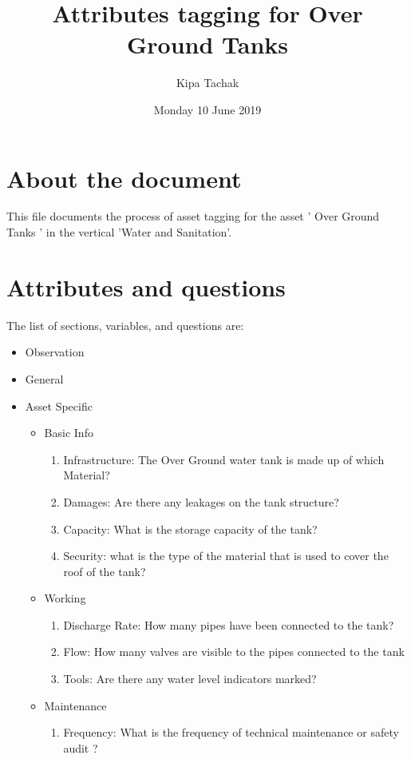 \documentclass[oneside,twocolumn]{article}
\title{Attributes tagging for 
Over Ground Tanks 
}
\author{Kipa Tachak}
\date{Monday 10 June 2019}
\begin{document}
\maketitle

\section{About the document}
This file documents the process of asset tagging for the asset '
Over Ground Tanks 
' in the
vertical 'Water and Sanitation'.

\section{Attributes and questions}
The list of sections, variables, and questions are:
    \begin{itemize}
    \item Observation
    \item General
    \item Asset Specific
    \begin{itemize}
\item Basic Info
\begin{enumerate}
\item Infrastructure: 
The Over Ground water tank is made up of which Material? 

\item Damages: 
Are there any leakages on the tank structure? 

\item Capacity: 
What is the storage capacity of the tank? 

\item Security: 
what is the type of the material that is used to cover the roof of the tank? 

\end{enumerate}

\item Working
\begin{enumerate}
\item Discharge Rate: How many pipes have been connected to the tank?
\item Flow: 
How many valves are visible to the pipes connected to the tank 

\item Tools: 
Are there any water level indicators marked? 

\end{enumerate}

\item Maintenance
\begin{enumerate}
\item Frequency: What is the frequency of technical maintenance or safety audit ?
\end{enumerate}

\end{itemize}

    \end{itemize}
\end{document}
